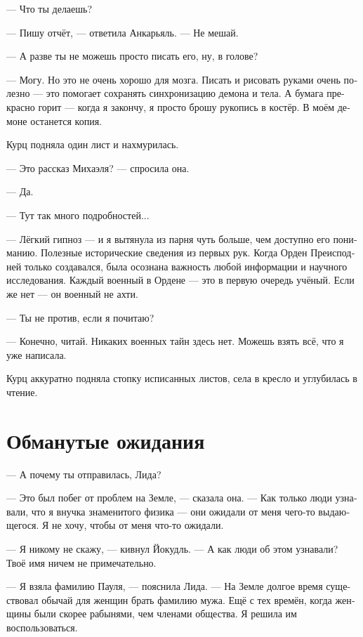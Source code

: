 \documentclass[a4paper,10pt,fleqn]{book}\usepackage{polyglossia}\setdefaultlanguage[babelshorthands=true]{russian}\setotherlanguage{english}\defaultfontfeatures{Ligatures=TeX,Mapping=tex-text}\usepackage{xcolor}\newcommand{\ml}[3]{#2}
\begin{document}
--- Что ты делаешь?

--- Пишу отчёт, --- ответила Анкарьяль.
--- Не мешай.

--- А разве ты не можешь просто писать его, ну, в голове?

--- Могу.
Но это не очень хорошо для мозга.
Писать и рисовать руками очень полезно --- это помогает сохранять синхронизацию демона и тела.
А бумага прекрасно горит --- когда я закончу, я просто брошу рукопись в костёр.
В моём демоне останется копия.

Курц подняла один лист и нахмурилась.

--- Это рассказ Михаэля? --- спросила она.

--- Да.

--- Тут так много подробностей...

--- Лёгкий гипноз --- и я вытянула из парня чуть больше, чем доступно его пониманию.
Полезные исторические сведения из первых рук.
Когда Орден Преисподней только создавался, была осознана важность любой информации и научного исследования.
\ml{$0$}
{Каждый военный в Ордене --- это в первую очередь учёный.}
{Every military in the Order is a scientist in the first place.}
\ml{$0$}
{Если же нет --- он военный не ахти.}
{Otherwise, they're not much of a military.''}

\ml{$0$}
{--- Ты не против, если я почитаю?}
{``Would you mind if I read?''}

--- Конечно, читай.
Никаких военных тайн здесь нет.
Можешь взять всё, что я уже написала.

Курц аккуратно подняла стопку исписанных листов, села в кресло и углубилась в чтение.

\section{Обманутые ожидания}

--- А почему ты отправилась, Лида?

--- Это был побег от проблем на Земле, --- сказала она.
--- Как только люди узнавали, что я внучка знаменитого физика --- они ожидали от меня чего-то выдающегося.
Я не хочу, чтобы от меня что-то ожидали.

--- Я никому не скажу, --- кивнул Йокудль.
--- А как люди об этом узнавали?
Твоё имя ничем не примечательно.

--- Я взяла фамилию Пауля, --- пояснила Лида.
--- На Земле долгое время существовал обычай для женщин брать фамилию мужа.
Ещё с тех времён, когда женщины были скорее рабынями, чем членами общества.
Я решила им воспользоваться.
\end{document}
